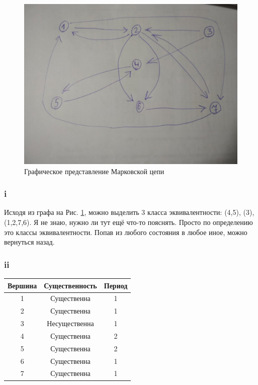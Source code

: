\documentclass[a4paper,12pt]{article}
\begin{document}
\begin{figure}[!h]
	\begin{center}
	\includegraphics[width=0.6\linewidth]{51}
	\caption{Графическое представление Марковской цепи}
	\label{graph}
\end{center}
\end{figure}


\subsubsection{i} 

Исходя из графа на Рис. \ref{graph}, можно выделить 3 класса эквивалентности: (4,5), (3), (1,2,7,6). Я не знаю, нужно ли тут ещё что-то пояснять. Просто по определению это классы эквивалентности. Попав из любого состояния в любое иное, можно вернуться назад.



\subsubsection{ii} 


\begin{table}[]
	\begin{center}
	\begin{tabular}{|c|c|c|}
		\hline
		\rowcolor[HTML]{9AFF99} 
		\textbf{Вершина} & \textbf{Существенность} & \textbf{Период} \\ \hline
		1                & Существенна             & 1               \\ \hline
		2                & Существенна             & 1               \\ \hline
		3                & Несущественна           & 1               \\ \hline
		4                & Существенна             & 2               \\ \hline
		5                & Существенна             & 2               \\ \hline
		6                & Существенна             & 1               \\ \hline
		7                & Существенна             & 1               \\ \hline
	\end{tabular}
\end{center}
\end{table}
\end{document}
